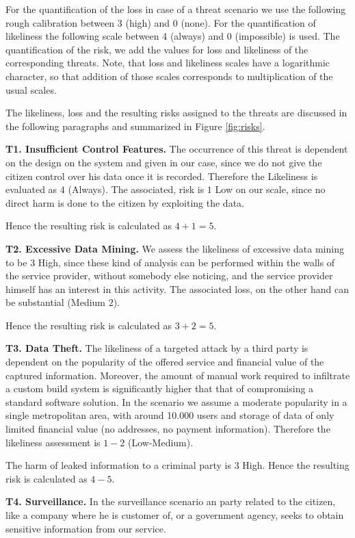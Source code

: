 \documentclass[runningheads,a4paper]{llncs}
\begin{document}
For the quantification of the loss in case of a threat scenario we use the following rough calibration between 3 (high) and 0 (none). For the quantification of likeliness the following scale between 4 (always) and 0 (impossible) is used. The quantification of the risk, we add the values for loss and likeliness of the corresponding threats. Note, that loss and
likeliness scales have a logarithmic character, so that addition
of those scales corresponds to multiplication of the usual scales.

The likeliness, loss and the resulting risks assigned to the threats
are discussed in the following paragraphs and summarized in Figure
\ref{fig:risks}.

\textbf{T1. Insufficient Control Features.}  The occurrence of this
threat is dependent on the design on the system and given in our case,
since we do not give the citizen control over his data once it is
recorded. Therefore the Likeliness is evaluated as $4$ (Always).  The
associated, risk is $1$ Low on our scale, since no direct harm is done to
the citizen by exploiting the data.

Hence the resulting risk is calculated as $4+1 = 5$.

\textbf{T2. Excessive Data Mining.}
We assess the likeliness of excessive data mining to be $3$ High, since
these kind of analysis can be performed within the walls of the service
provider, without somebody else noticing, and the service provider himself
has an interest in this activity. The associated loss, on the other hand can be substantial (Medium $2$). 

Hence the resulting risk is calculated as $3+2 = 5$.

\textbf{T3. Data Theft.}
The likeliness of a targeted attack by a third party is dependent on
the popularity of the offered service and financial value of the
captured information. Moreover, the amount of manual work required to
infiltrate a custom build system is significantly higher that that of
compromising a standard software solution. In the scenario we assume a
moderate popularity in a single metropolitan area, with around 10.000
users and storage of data of only limited financial value (no
addresses, no payment information). Therefore the likeliness
assessment is $1-2$ (Low-Medium).

The harm of leaked information to a criminal party is $3$ High.
Hence the resulting risk is calculated as $4-5$.

\textbf{T4. Surveillance.}  In the surveillance scenario an party
related to the citizen, like a company where he is customer of, or a
government agency, seeks to obtain sensitive information from our
service.
\end{document}
